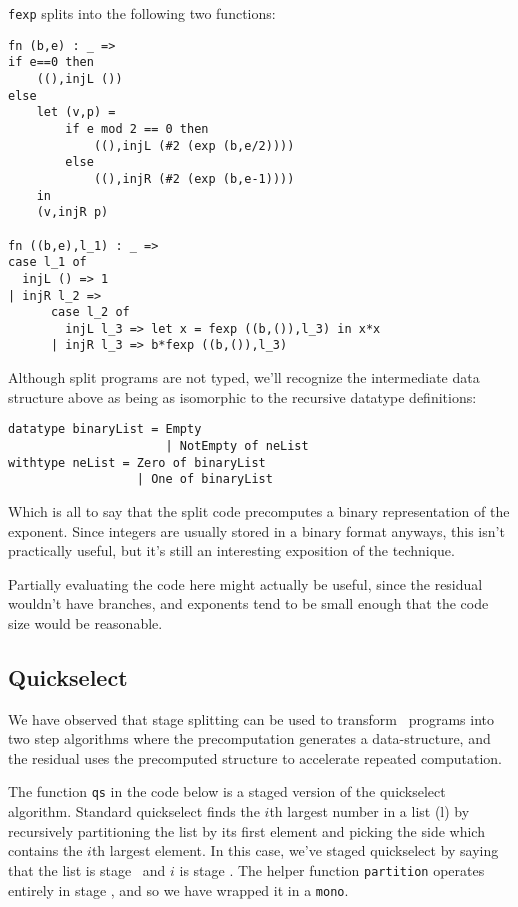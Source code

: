 \noindent
{\tt fexp} splits into the following two functions:


\begin{lstlisting} 
fn (b,e) : _ =>
if e==0 then
    ((),injL ())
else
    let (v,p) =
        if e mod 2 == 0 then
            ((),injL (#2 (exp (b,e/2))))
        else
            ((),injR (#2 (exp (b,e-1))))
    in
    (v,injR p)

fn ((b,e),l_1) : _ =>
case l_1 of
  injL () => 1
| injR l_2 =>
      case l_2 of
        injL l_3 => let x = fexp ((b,()),l_3) in x*x
      | injR l_3 => b*fexp ((b,()),l_3)
\end{lstlisting}

Although split programs are not typed, we'll recognize the intermediate data structure 
above as being as isomorphic to the recursive datatype definitions:
\begin{lstlisting} 
datatype binaryList = Empty 
                      | NotEmpty of neList
withtype neList = Zero of binaryList 
                  | One of binaryList
\end{lstlisting}
Which is all to say that the split code precomputes a binary representation of the exponent.
Since integers are usually stored in a binary format anyways, this isn't practically useful,
but it's still an interesting exposition of the technique.

Partially evaluating the code here might actually be useful, since the residual wouldn't have branches,
and exponents tend to be small enough that the code size would be reasonable.

\subsection{Quickselect}

We have observed that stage splitting can be used to transform \lang\ programs into two step algorithms where the precomputation generates a data-structure, and the residual uses the precomputed structure to accelerate repeated computation.  

The function {\tt qs} in the code below is a staged version of the quickselect algorithm.
Standard quickselect finds the $i$th largest number in a list (l) by recursively partitioning the list by its 
first element and picking the side which contains the $i$th largest element.
In this case, we've staged quickselect by saying that the list is stage \bbone\ and $i$ is stage \bbtwo.
The helper function {\tt partition} operates entirely in stage \bbone, and so we have wrapped it in a \texttt{mono}.

